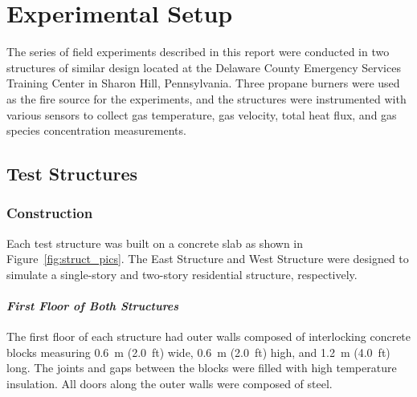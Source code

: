 
\renewcommand{\thechapter}{2}

\chapter{Experimental Setup}
\label{chap:exp_setup}
The series of field experiments described in this report were conducted in two structures of similar design located at the Delaware County Emergency Services Training Center in Sharon Hill, Pennsylvania. Three propane burners were used as the fire source for the experiments, and the structures were instrumented with various sensors to collect gas temperature, gas velocity, total heat flux, and gas species concentration measurements.

\section{Test Structures}

\subsection{Construction}
Each test structure was built on a concrete slab as shown in Figure~\ref{fig:struct_pics}. The East Structure and West Structure were designed to simulate a single-story and two-story residential structure, respectively.

\subsubsection*{\textit{First Floor of Both Structures}}
The first floor of each structure had outer walls composed of interlocking concrete blocks measuring 0.6~m (2.0~ft) wide, 0.6~m (2.0~ft) high, and 1.2~m (4.0~ft) long. The joints and gaps between the blocks were filled with high temperature insulation. All doors along the outer walls were composed of steel.

